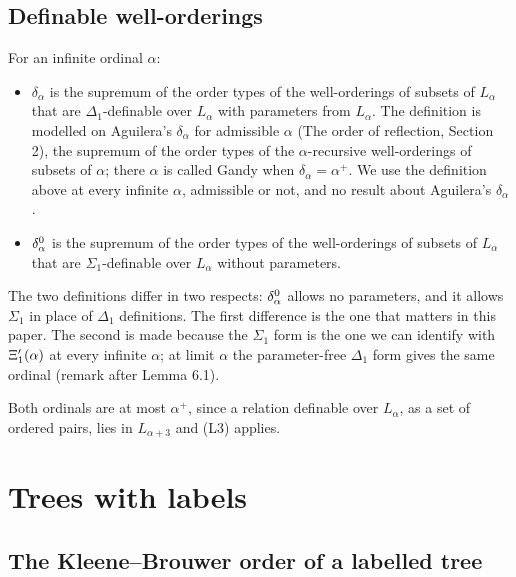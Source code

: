 \documentclass[11pt]{article}
\begin{document}
\subsection{Definable well-orderings}

For an infinite ordinal $\alpha$:
\begin{itemize}
\item $\delta_{\alpha}$ is the supremum of the order types of the well-orderings of subsets of $L_{\alpha}$ that
  are $\Delta_1$-definable over $L_{\alpha}$ with parameters from $L_{\alpha}$. The definition is modelled on Aguilera's
  $\delta_{\alpha}$ for admissible $\alpha$ (The order of reflection, Section 2), the supremum of the order types of
  the $\alpha$-recursive well-orderings of subsets of $\alpha$; there $\alpha$ is called Gandy when
  $\delta_{\alpha} = \alpha^+$. We use the definition above at every infinite $\alpha$, admissible or not, and no
  result about Aguilera's $\delta_{\alpha}$.
\item $\delta^0_{\alpha}$ is the supremum of the order types of the well-orderings of subsets of $L_{\alpha}$ that are
  $\Sigma_1$-definable over $L_{\alpha}$ without parameters.
\end{itemize}
The two definitions differ in two respects: $\delta^0_{\alpha}$ allows no parameters, and it allows $\Sigma_1$ in place of
$\Delta_1$ definitions. The first difference is the one that matters in this paper. The second is made because the
$\Sigma_1$ form is the one we can identify with $\Xi'_1(\alpha)$ at every infinite $\alpha$; at limit $\alpha$ the
parameter-free $\Delta_1$ form gives the same ordinal (remark after Lemma 6.1).

Both ordinals are at most $\alpha^+$, since a
relation definable over $L_{\alpha}$, as a set of ordered pairs, lies in $L_{\alpha+3}$ and (L3) applies.

\section{Trees with labels}

\subsection{The Kleene--Brouwer order of a labelled tree}
\end{document}
